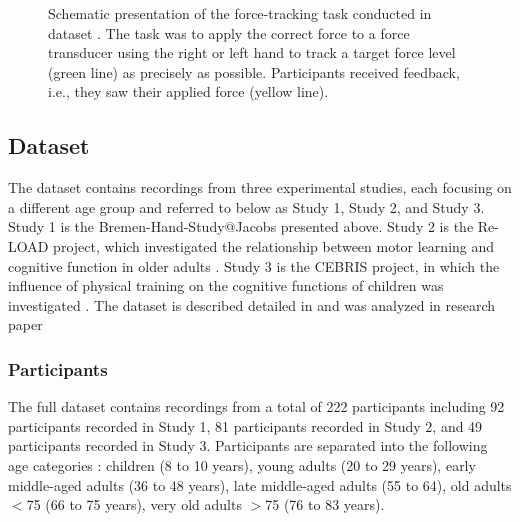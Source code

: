 \begin{figure}[h]
\begin{center}

\caption[Schematic presentation of the force-tracking task conducted in dataset .]{Schematic presentation of the force-tracking task conducted in dataset . The task was to apply the correct force to a force transducer using the right or left hand to track a target force level (green line) as precisely as possible. Participants received feedback, i.e., they saw their applied force (yellow line).}
\label{fig:DSI_exp1}
\end{center}
\end{figure}

\subsection{Dataset }
\label{methods:datasets:II}
The  dataset contains recordings from three experimental studies, each focusing on a different age group and referred to below as Study 1, Study 2, and Study 3.\\
Study 1 is the Bremen-Hand-Study@Jacobs presented above. Study 2 is the Re-LOAD project, which investigated the relationship between motor learning and cognitive function in older adults \cite{HUBNER2018104, Hübner2018}. Study 3 is the CEBRIS project, in which the influence of physical training on the cognitive functions of children was investigated \cite{Koutsandreou2016}. The dataset is described detailed in \cite{Reuter2019} and was analyzed in research paper 

\subsubsection{Participants}
\label{methods:datasets:II:participants}
The full dataset contains recordings from a total of 222 participants including 92 participants recorded in Study 1, 81 participants recorded in Study 2, and 49 participants recorded in Study 3. Participants are separated into the following age categories \cite{Reuter2019}: children (8 to 10 years), young adults (20 to 29 years), early middle-aged adults (36 to 48 years), late middle-aged adults (55 to 64), old adults $<$75 (66 to 75 years), very old adults $>$75 (76 to 83 years).

